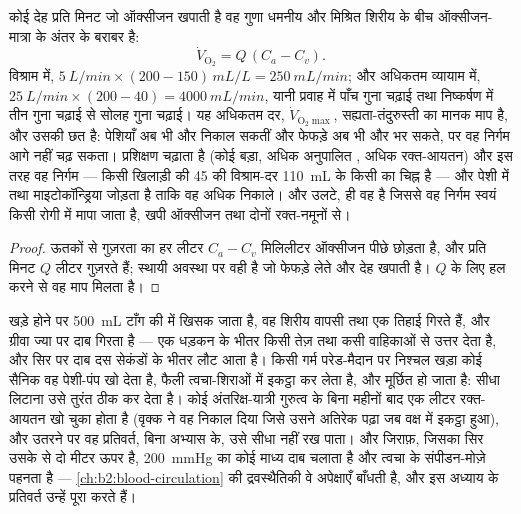 \begin{theorem}[ऑक्सीजन-वितरण और फ़िक सिद्धांत]\label{thm:b2:blood-pressure:fick}
कोई देह प्रति मिनट जो ऑक्सीजन खपाती है वह 
गुणा धमनीय और मिश्रित शिरीय  के बीच ऑक्सीजन-मात्रा के
अंतर के बराबर है:
\[
\dot V_{\mathrm{O_2}} = Q\,(C_a - C_v).
\]
विश्राम में, $\qty{5}{L/min}\times(200 - 150)\,\unit{mL/L} = \qty{250}{mL/min}$;
और अधिकतम व्यायाम में, $\qty{25}{L/min}\times(200 - 40) =
\qty{4000}{mL/min}$, यानी प्रवाह में पाँच गुना चढ़ाई तथा निष्कर्षण में
तीन गुना चढ़ाई से सोलह गुना चढ़ाई। यह अधिकतम दर,
$\dot V_{\mathrm{O_2}\max}$, सह्यता-तंदुरुस्ती का मानक माप है,
और उसकी छत  है: पेशियाँ अब भी और निकाल
सकतीं और फेफड़े अब भी और भर सकते, पर वह निर्गम
आगे नहीं चढ़ सकता। प्रशिक्षण  चढ़ाता है (कोई बड़ा, अधिक
अनुपालित , अधिक रक्त-आयतन) और इस तरह वह निर्गम --- किसी
खिलाड़ी की 45 की विश्राम-दर \qty{110}{mL} के किसी  का
चिह्न है --- और पेशी में  तथा माइटोकॉन्ड्रिया जोड़ता है
ताकि वह अधिक निकाले। और उलटे,  ही वह है जिससे वह
निर्गम स्वयं किसी रोगी में मापा जाता है, खपी ऑक्सीजन तथा
दोनों रक्त-नमूनों से।
\end{theorem}
\begin{proof}
ऊतकों से गुज़रता  का हर लीटर $C_a - C_v$
मिलिलीटर ऑक्सीजन पीछे छोड़ता है, और प्रति मिनट $Q$ लीटर गुज़रते हैं;
स्थायी अवस्था पर वही है जो फेफड़े लेते और देह खपाती है।
$Q$ के लिए हल करने से वह माप मिलता है।
\end{proof}

\begin{example}[खड़े होना, मूर्छित होना, और वह अंतरिक्ष-यात्री]\label{ex:b2:blood-pressure:standing}
खड़े होने पर \qty{500}{mL}  टाँग की  में खिसक जाता है, वह
शिरीय वापसी तथा  एक तिहाई गिरते हैं, और
ग्रीवा ज्या पर दाब गिरता है ---  एक धड़कन के भीतर
किसी तेज़  तथा कसी वाहिकाओं से उत्तर देता है, और सिर पर दाब
दस सेकंडों के भीतर लौट आता है। किसी गर्म परेड-मैदान पर निश्चल खड़ा कोई
सैनिक वह पेशी-पंप खो देता है, फैली त्वचा-शिराओं में
 इकट्ठा कर लेता है, और मूर्छित हो जाता है: सीधा लिटाना उसे तुरंत ठीक कर देता है। कोई
अंतरिक्ष-यात्री गुरुत्व के बिना महीनों बाद एक लीटर रक्त-आयतन
खो चुका होता है (वृक्क ने वह निकाल दिया जिसे उसने अतिरेक पढ़ा जब 
वक्ष में इकट्ठा हुआ), और उतरने पर वह प्रतिवर्त, बिना अभ्यास के,
उसे सीधा नहीं रख पाता। और जिराफ़, जिसका सिर उसके  से दो मीटर
ऊपर है, \qty{200}{mmHg} का कोई माध्य दाब चलाता है और
त्वचा के संपीडन-मोज़े पहनता है --- \cref{ch:b2:blood-circulation}
की द्रवस्थैतिकी वे अपेक्षाएँ बाँधती है, और इस अध्याय के प्रतिवर्त
उन्हें पूरा करते हैं।
\end{example}

